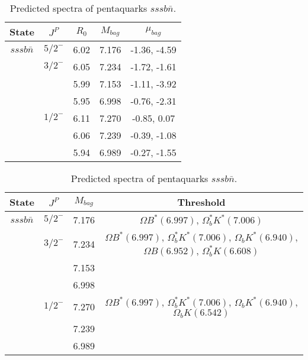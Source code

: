 \documentclass[prd,twocolumn,floatfix,nofootinbib]{revtex4}
\begin{document}
\renewcommand{\tabcolsep}{0.5cm}
\renewcommand{\arraystretch}{1.2}
\begin{table*}[!htbp]
    \caption{Predicted spectra of pentaquarks $sssb\bar{n}$.}
    \begin{tabular}{ccccc}
        \hline\hline
        {\rm State} &$J^{P}$ &$R_{0}$ &$M_{bag}$ &$\mu_{bag}$ \\ \hline
        $sssb\bar{n}$
            &${5/2}^{-}$    &6.02   &7.176  &-1.36, -4.59 \\
            &${3/2}^{-}$    &6.05   &7.234  &-1.72, -1.61 \\
            &               &5.99   &7.153  &-1.11, -3.92 \\
            &               &5.95   &6.998  &-0.76, -2.31 \\
            &${1/2}^{-}$    &6.11   &7.270  &-0.85, 0.07 \\
            &               &6.06   &7.239  &-0.39, -1.08 \\
            &               &5.94   &6.989  &-0.27, -1.55 \\
        
        \hline\hline
    \end{tabular}
\end{table*}

\renewcommand{\tabcolsep}{0.5cm}
\renewcommand{\arraystretch}{1.2}
\begin{table*}[!htbp]
    \caption{Predicted spectra of pentaquarks $sssb\bar{n}$.}
    \begin{tabular}{cccc}
        \hline\hline
        {\rm State} &$J^{P}$ &$M_{bag}$ &Threshold \\ \hline
        $sssb\bar{n}$
            &${5/2}^{-}$    &7.176  &$\Omega B^{\ast}(6.997)$, $\Omega_{b}^{\ast}K^{\ast}(7.006)$ \\
            &${3/2}^{-}$    &7.234  &$\Omega B^{\ast}(6.997)$, $\Omega_{b}^{\ast}K^{\ast}(7.006)$, $\Omega_{b}K^{\ast}(6.940)$, $\Omega B(6.952)$, $\Omega_{b}^{\ast}K(6.608)$ \\
            &               &7.153  & \\
            &               &6.998  & \\
            &${1/2}^{-}$    &7.270  &$\Omega B^{\ast}(6.997)$, $\Omega_{b}^{\ast}K^{\ast}(7.006)$, $\Omega_{b}K^{\ast}(6.940)$, $\Omega_{b}K(6.542)$ \\
            &               &7.239  & \\
            &               &6.989  & \\
        
        \hline\hline
    \end{tabular}
\end{table*}
\end{document}
